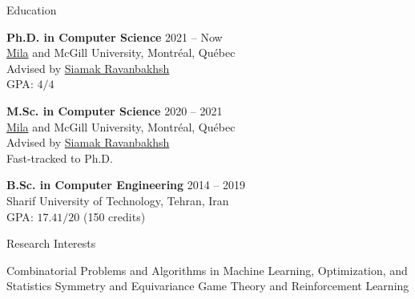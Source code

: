 \documentclass{resume}
\newcommand{\InternalSpace}{\vspace{0.18cm}}
\newenvironment{MySection}[1]
{\begin{category}{#1}}
{\end{category}}
\newcommand{\MyItem}{\citembullet}
\def \Siamak {\href{https://www.siamak.page}{Siamak Ravanbakhsh}}
\begin{document}
\maketitle

\vspace{-0.75cm}

\InternalSpace
\InternalSpace



\begin{MySection}{Education}

\MyItem
\textbf{Ph.D. in Computer Science} \hfill{ 2021 -- Now }\\
\href{https://mila.quebec/en/}{Mila} and McGill University, Montréal, Québec\\
Advised by \Siamak\\
\textsc{GPA}: $4/4$

\MyItem
\textbf{M.Sc. in Computer Science} \hfill{ 2020 -- 2021 }\\
\href{https://mila.quebec/en/}{Mila} and McGill University, Montréal, Québec\\
Advised by \Siamak\\
Fast-tracked to Ph.D.

\MyItem
\textbf{B.Sc. in Computer Engineering} \hfill{ 2014 -- 2019 }\\
Sharif University of Technology, Tehran, Iran\\
\textsc{GPA}: $17.41/20$ (150 credits)\\

\end{MySection}

\InternalSpace



\begin{MySection}{Research Interests}


\MyItem Combinatorial Problems and Algorithms in Machine Learning, Optimization, and Statistics
\MyItem Symmetry and Equivariance
\MyItem Game Theory and Reinforcement Learning

\end{MySection}

\InternalSpace
\end{document}
